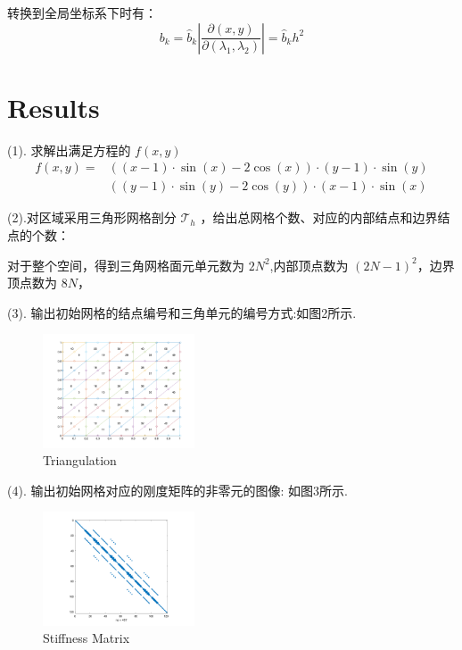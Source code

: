 \documentclass[11pt]{ctexart}
\begin{document}
转换到全局坐标系下时有：
\begin{equation}
    b_k = \hat{b}_k \left|\frac{\partial(x,y)}{\partial(\lambda_1,\lambda_2)}\right|= \hat{b}_k h^2
\end{equation}


\section{Results}
(1). 求解出满足方程的 $ f(x,y) $
\begin{equation}
  \begin{aligned}
    f(x,y) = &((x-1) \cdot \sin(x)-2\cos(x)) \cdot (y-1) \cdot \sin(y)\\
    &((y-1)\cdot\sin(y)-2\cos(y))\cdot(x-1) \cdot \sin(x)
  \end{aligned}
\end{equation}

(2).对区域采用三角形网格剖分 $ \mathcal{T}_h $ ，给出总网格个数、对应的内部结点和边界结点的个数：

对于整个空间，得到三角网格面元单元数为 $ 2N^2 $,内部顶点数为 $ (2N-1)^2 $，边界顶点数为 $ 8N$，

(3). 输出初始网格的结点编号和三角单元的编号方式:如图2所示.
\begin{figure}[htbp]
      \centering
      \includegraphics[width=0.4\textwidth]{triangulation.png}
      \caption{Triangulation}
      \label{fig:triangulation}
\end{figure}

(4). 输出初始网格对应的刚度矩阵的非零元的图像: 如图3所示.
\begin{figure}[htbp]
  \centering
  \includegraphics[width=0.4\textwidth]{matrix.png}
  \caption{Stiffness Matrix}
  \label{fig:stiffness}
\end{figure}
\end{document}
